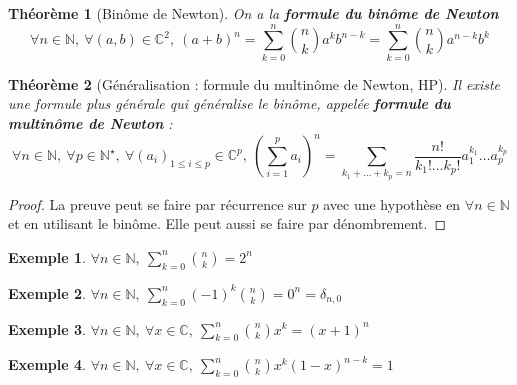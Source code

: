 \documentclass[french]{book}
\newcommand{\N}{\mathbb{N}}
\newcommand{\C}{\mathbb{C}}
\newcommand{\st}{^\star}
\theoremstyle{plain}
\newtheorem{thm}{Théorème}[chapter]
\theoremstyle{definition}
\newtheorem{exa}{Exemple}[chapter]
\theoremstyle{remark}
\begin{document}
\begin{thm}[Binôme de Newton]
	On a la \textbf{formule du binôme de Newton}
	$$\forall n\in\N,\ \forall(a,b)\in\C^2,\ (a+b)^n=\sum_{k=0}^{n}\binom{n}{k}a^kb^{n-k}=\sum_{k=0}^{n}\binom{n}{k}a^{n-k}b^{k}$$
\end{thm}
\begin{thm}[Généralisation : formule du multinôme de Newton, HP]
	Il existe une formule plus générale qui généralise le binôme, appelée \textbf{formule du multinôme de Newton} : $$\forall n\in\N,\ \forall p\in\N\st,\ \forall(a_i)_{1\leqslant i\leqslant p}\in\C^p,\ \left(\sum_{i=1}^{p}a_i\right)^n=\sum_{k_1+\ldots+k_p=n}\frac{n!}{k_1!\ldots k_p!}a_1^{k_1}\ldots a_p^{k_p}$$
\end{thm}
\begin{proof}
	La preuve peut se faire par récurrence sur $p$ avec une hypothèse en $\forall n\in\N$et en utilisant le binôme. Elle peut aussi se faire par dénombrement.
\end{proof}
\begin{exa}
	$\forall n\in\N,\ \displaystyle\sum_{k=0}^{n}\binom{n}{k}=2^n$
\end{exa}
\begin{exa}
	$\forall n\in\N,\ \displaystyle\sum_{k=0}^{n}(-1)^k\binom{n}{k}=0^n=\delta_{n,0}$
\end{exa}
\begin{exa}
	$\forall n\in\N,\ \forall x\in\C,\ \displaystyle\sum_{k=0}^{n}\binom{n}{k}x^k=(x+1)^n$
\end{exa}
\begin{exa}
	$\forall n\in\N,\ \forall x\in\C,\ \displaystyle\sum_{k=0}^{n}\binom{n}{k}x^k(1-x)^{n-k}=1$
\end{exa}
\end{document}
